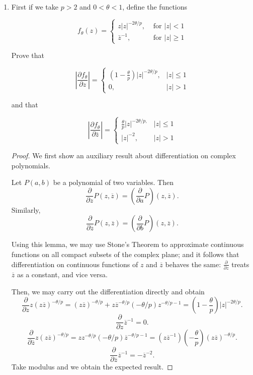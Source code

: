 
\begin{enumerate}
	\item 
First if we take $p>2$ and $0<\theta<1$, define the functions

\[
f_\theta(z)= \begin{cases}z|z|^{-2 \theta / p}, & \text { for }|z|<1 \\ \bar{z}^{-1}, & \text { for }|z| \geq 1\end{cases}
\]


Prove that

\[
\left|\frac{\partial f_\theta}{\partial z}\right|=\left\{\begin{aligned}
\left(1-\frac{\theta}{p}\right)|z|^{-2 \theta / p}, & |z| \leq 1 \\
0, & |z|>1
\end{aligned}\right.
\]

and that

\[
\left|\frac{\partial f_\theta}{\partial \bar{z}}\right|= \begin{cases}\frac{\theta}{p}|z|^{-2 \theta / p,} & |z| \leq 1 \\ |z|^{-2}, & |z|>1\end{cases}
\]
		
\begin{proof}
	We first show an auxiliary result about differentiation on complex polynomials.
	\begin{lemma}
		
		Let $P(a, b)$ be a polynomial of two variables. Then
		\[
			\frac{\partial }{\partial z} P(z, \overline{z} ) = \left(\frac{\partial }{\partial a} P\right)(z, \overline{z} )
		.\] 
		Similarly,
\[
			\frac{\partial }{\partial \overline{z} } P(z, \overline{z} ) = \left(\frac{\partial }{\partial b} P\right)(z, \overline{z} )
		.\]
	\end{lemma}
	Using this lemma, we may use Stone's Theorem to approximate continuous functions on all compact subsets of the complex plane; and it follows that differentiation on continuous functions of $z$ and $\overline{z} $ behaves the same: $\frac{\partial }{\partial z} $ treats $\overline{z} $ as a constant, and vice versa.

	Then, we may carry out the differentiation directly and obtain
	\[
		\frac{\partial }{\partial z} z (z \overline{z} )^{- \theta / p} = (z \overline{z} )^{- \theta / p} + z \overline{z} ^{- \theta / p} (- \theta / p) z^{- \theta / p - 1} = (1 - \frac{\theta}{p})|z|^{- 2 \theta / p}
	.\] 
	\[
		\frac{\partial }{\partial z} \overline{z} ^{-1} = 0
	.\] 
	\[
		\frac{\partial }{\partial \overline{z} } z (z \overline{z} )^{- \theta / p} = z z^{- \theta / p} (- \theta / p) \overline{z} ^{- \theta / p - 1} = (z \overline{z} ^{-1}) (- \frac{\theta}{p}) (z \overline{z} )^{- \theta / p}
	.\] 
	\[
		\frac{\partial }{\partial \overline{z} } \overline{z} ^{-1} = - \overline{z} ^{- 2}
	.\] 
	Take modulus and we obtain the expected result.


\end{proof}
\end{enumerate}
